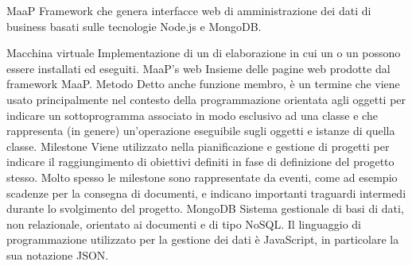 \elemento
{MaaP}
{Framework che genera interfacce web di amministrazione dei dati di business basati sulle tecnologie Node.js e MongoDB. }

\elemento
{Macchina virtuale} 
{Implementazione  di un  di elaborazione in cui un  o un  possono essere installati ed eseguiti.}
\elemento
{MaaP's web}
{Insieme delle pagine web prodotte dal framework MaaP.}
\elemento
{Metodo}
{Detto anche funzione membro, è un termine che viene usato principalmente nel contesto della programmazione orientata agli oggetti per indicare un sottoprogramma associato in modo esclusivo ad una classe e che rappresenta (in genere) un'operazione eseguibile sugli oggetti e istanze di quella classe.}
\elemento
{Milestone}
{Viene utilizzato nella pianificazione e gestione di progetti per indicare il raggiungimento di obiettivi definiti in fase di definizione del progetto stesso. Molto spesso le milestone sono rappresentate da eventi, come ad esempio scadenze per la consegna di documenti, e indicano importanti traguardi intermedi durante lo svolgimento del progetto.}
\elemento
{MongoDB}
{Sistema gestionale di basi di dati, non relazionale, orientato ai documenti e di tipo NoSQL. Il linguaggio di programmazione utilizzato per la gestione dei dati è JavaScript, in particolare la sua notazione JSON.}
